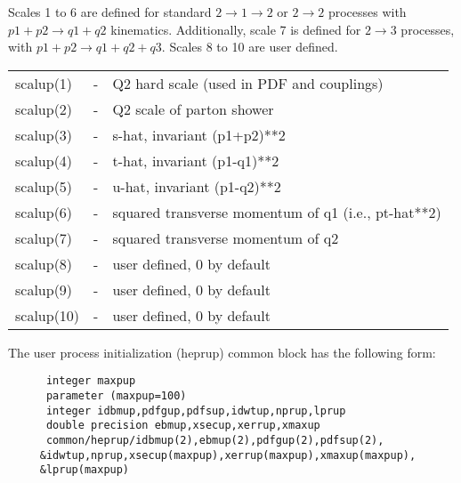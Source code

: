 Scales 1 to 6 are defined for standard $2\rightarrow1\rightarrow2$ or $2\rightarrow2$ processes 
with $p1 + p2 \rightarrow q1 + q2$ kinematics.
Additionally, scale 7 is defined for $2\rightarrow3$ processes,
with $p1 + p2 \rightarrow q1 + q2 + q3$.  
Scales 8 to 10 are user defined.
\begin{center}
\begin{tabular}{lcl}
     scalup(1)&-& Q2 hard scale (used in PDF and couplings)\\
     scalup(2)&-& Q2 scale of parton shower\\
     scalup(3)&-& s-hat, invariant (p1+p2)**2\\
     scalup(4)&-& t-hat, invariant (p1-q1)**2\\
     scalup(5)&-& u-hat, invariant (p1-q2)**2\\
     scalup(6)&-& squared transverse momentum of q1 (i.e., pt-hat**2)\\
     scalup(7)&-& squared transverse momentum of q2\\
     scalup(8)&-& user defined, 0 by default\\
     scalup(9)&-& user defined, 0 by default\\
     scalup(10)&-& user defined, 0 by default\\
\end{tabular}
\end{center}

\noindent The user process initialization (heprup) common block has the following form:
\begin{verbatim}
      integer maxpup
      parameter (maxpup=100)
      integer idbmup,pdfgup,pdfsup,idwtup,nprup,lprup
      double precision ebmup,xsecup,xerrup,xmaxup
      common/heprup/idbmup(2),ebmup(2),pdfgup(2),pdfsup(2),
     &idwtup,nprup,xsecup(maxpup),xerrup(maxpup),xmaxup(maxpup),
     &lprup(maxpup)
\end{verbatim}

